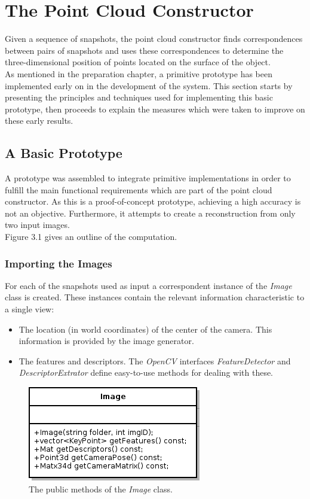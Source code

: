 \documentclass[12pt,a4paper,twoside,openright]{report}
\begin{document}
\section{The Point Cloud Constructor}
Given a sequence of snapshots, the point cloud constructor finds correspondences between pairs of snapshots and uses these correspondences to determine the three-dimensional position of points located on the surface of the object. \\
\linebreak
As mentioned in the preparation chapter, a primitive prototype has been implemented early on in the development of the system. This section starts by presenting the principles and techniques used for implementing this basic prototype, then proceeds to explain the measures which were taken to improve on these early results.

\subsection{A Basic Prototype}
A prototype was assembled to integrate primitive implementations in order to fulfill the main functional requirements which are part of the point cloud constructor. As this is a proof-of-concept prototype, achieving a high accuracy is not an objective. Furthermore, it attempts to create a reconstruction from only two input images. \\
Figure 3.1 gives an outline of the computation.

\subsubsection{Importing the Images}
For each of the snapshots used as input a correspondent instance of the \emph{Image} class is created. These instances contain the relevant information characteristic to a single view:
\begin{itemize}
\item The location (in world coordinates) of the center of the camera. This information is provided by the image generator.
\item The features and descriptors. The \emph{OpenCV} interfaces \emph{FeatureDetector} and \emph{DescriptorExtrator} define easy-to-use methods for dealing with these.
\end{itemize}

\begin{figure}
\centerline{\includegraphics[scale=0.6]{figs/image.png}}
\caption{The public methods of the \emph{Image} class.}
\end{figure}
\end{document}

